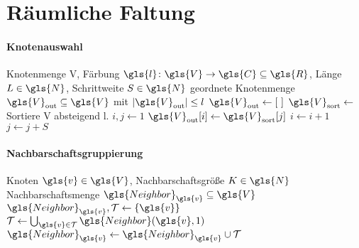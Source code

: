 \section{Räumliche Faltung}
\label{raeumliche_faltung}

\paragraph{Knotenauswahl}
\label{knotenauswahl}

\begin{algorithm}[t]
\centering
\begin{algorithmic}
  \REQUIRE{} Knotenmenge \gls{V}, Färbung $\gls{l} \colon \gls{V} \to \gls{C} \subseteq \gls{R}$, Länge $L \in \gls{N}$, Schrittweite $S \in \gls{N}$
  \ENSURE{} geordnete Knotenmenge $\gls{V}_{\mathrm{out}} \subseteq \gls{V}$ mit $\left|\gls{V}_{\mathrm{out}}\right| \leq l$
  \STATE{} $\gls{V}_\mathrm{out} \leftarrow \left[\,\,\right]$
  \STATE{} $\gls{V}_{\mathrm{sort}} \leftarrow$ Sortiere \gls{V} absteigend \bzgl{} \gls{l}.
  \STATE{} $i, j \leftarrow 1$
      \STATE{} $\gls{V}_{\mathrm{out}}\left[i\right] \leftarrow \gls{V}_{\mathrm{sort}}\left[j\right]$
    \ENDIF{}
    \STATE{} $i \leftarrow i + 1$
    \STATE{} $j \leftarrow j + S$
  \ENDWHILE{}
\end{algorithmic}
\caption[Knotenauswahl der räumlichen Faltung]{}
\label{alg:knotenauswahl}
\end{algorithm}

\paragraph{Nachbarschaftsgruppierung}
\label{nachbarschaftsgruppierung}

\begin{algorithm}[t]
\centering
\begin{algorithmic}
  \REQUIRE{} Knoten $\gls{v} \in \gls{V}$, Nachbarschaftsgröße $K \in \gls{N}$
  \ENSURE{} Nachbarschaftsmenge $\gls{Neighbor}_{\gls{v}} \subseteq \gls{V}$
  \STATE{} $\gls{Neighbor}_{\gls{v}}, \mathcal{T} \leftarrow \left\{\gls{v}\right\}$
    \STATE{} $\mathcal{T} \leftarrow \bigcup_{\gls{v} \in \mathcal{T}} \gls{Neighbor}\left(\gls{v}, 1\right)$
    \STATE{} $\gls{Neighbor}_{\gls{v}} \leftarrow \gls{Neighbor}_{\gls{v}} \cup \mathcal{T}$
  \ENDWHILE{}
\end{algorithmic}
\caption[Nachbarschaftsgruppierung der räumlichen Faltung]{}
\label{alg:knotenauswahl}
\end{algorithm}

